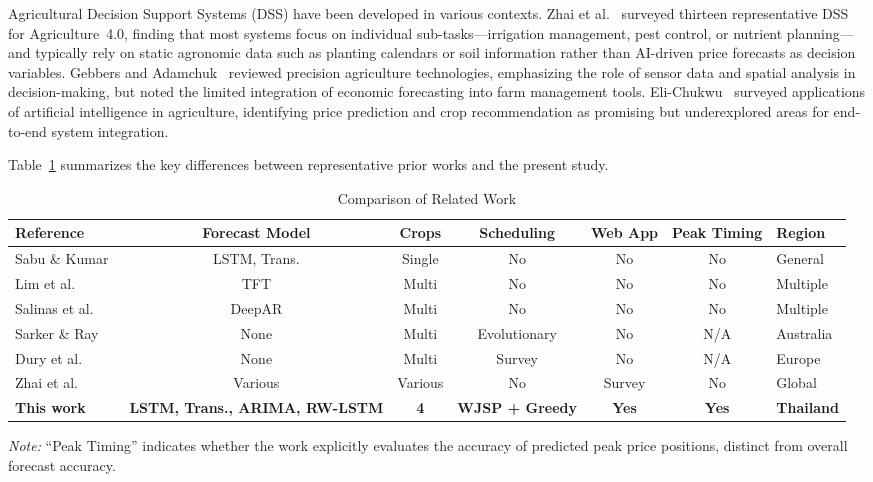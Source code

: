 \documentclass[journal]{IEEEtran}
\begin{document}
Agricultural Decision Support Systems (DSS) have been developed in various contexts. Zhai et al.~\cite{zhai2020dss} surveyed thirteen representative DSS for Agriculture~4.0, finding that most systems focus on individual sub-tasks---irrigation management, pest control, or nutrient planning---and typically rely on static agronomic data such as planting calendars or soil information rather than AI-driven price forecasts as decision variables. Gebbers and Adamchuk~\cite{gebbers2010} reviewed precision agriculture technologies, emphasizing the role of sensor data and spatial analysis in decision-making, but noted the limited integration of economic forecasting into farm management tools. Eli-Chukwu~\cite{elichukwu2019} surveyed applications of artificial intelligence in agriculture, identifying price prediction and crop recommendation as promising but underexplored areas for end-to-end system integration.

Table~\ref{tab:related_work} summarizes the key differences between representative prior works and the present study.

\begin{table}[htbp]
  \centering
  \caption{Comparison of Related Work}
  \label{tab:related_work}
  \begin{tabular}{lcccccl}
    \toprule
    \textbf{Reference} & \textbf{Forecast Model} & \textbf{Crops} & \textbf{Scheduling} & \textbf{Web App} & \textbf{Peak Timing} & \textbf{Region} \\
    \midrule
    Sabu \& Kumar~\cite{rohan2025crop}      & LSTM, Trans.          & Single  & No  & No  & No  & General \\
    Lim et al.~\cite{lim2021tft}           & TFT                   & Multi   & No  & No  & No  & Multiple \\
    Salinas et al.~\cite{salinas2020deepar} & DeepAR                & Multi   & No  & No  & No  & Multiple \\
    Sarker \& Ray~\cite{sarker2009crop}     & None                  & Multi   & Evolutionary & No  & N/A & Australia \\
    Dury et al.~\cite{dury2012crop}         & None                  & Multi   & Survey       & No  & N/A & Europe \\
    Zhai et al.~\cite{zhai2020dss}          & Various               & Various & No           & Survey & No  & Global \\
    \midrule
    \textbf{This work} & \textbf{LSTM, Trans., ARIMA, RW-LSTM} & \textbf{4} & \textbf{WJSP + Greedy} & \textbf{Yes} & \textbf{Yes} & \textbf{Thailand} \\
    \bottomrule
  \end{tabular}
  \vspace{6pt}
  \par\raggedright\scriptsize\textit{Note:} ``Peak Timing'' indicates whether the work explicitly evaluates the accuracy of predicted peak price positions, distinct from overall forecast accuracy.
\end{table}
\end{document}
